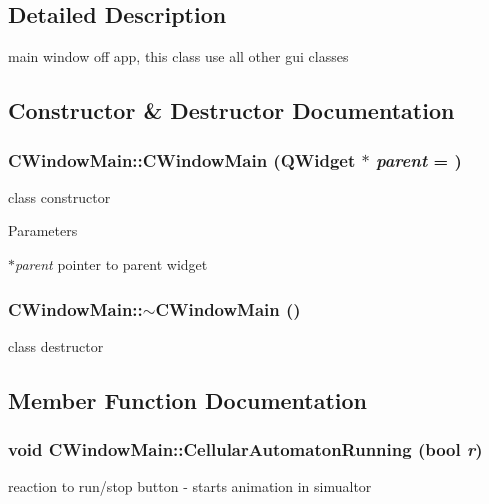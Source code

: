 \subsection{Detailed Description}
main window off app, this class use all other gui classes 

\subsection{Constructor \& Destructor Documentation}
\hypertarget{classCWindowMain_ab2ee214f54da9d9e3493e32c17dceb3b}{
\subsubsection[{CWindowMain}]{\setlength{\rightskip}{0pt plus 5cm}CWindowMain::CWindowMain (QWidget $\ast$ {\em parent} = {})}}
\label{classCWindowMain_ab2ee214f54da9d9e3493e32c17dceb3b}
class constructor


\begin{DoxyParams}{Parameters}
\item[{\em $\ast$parent}]pointer to parent widget \end{DoxyParams}
\hypertarget{classCWindowMain_ae916ee64d7cf20837fa6cf92a94084bb}{
\subsubsection[{$\sim$CWindowMain}]{\setlength{\rightskip}{0pt plus 5cm}CWindowMain::$\sim$CWindowMain ()}}
\label{classCWindowMain_ae916ee64d7cf20837fa6cf92a94084bb}
class destructor 

\subsection{Member Function Documentation}
\hypertarget{classCWindowMain_aba0d4bd86968982f3d61d5fbaeb946e5}{
\subsubsection[{CellularAutomatonRunning}]{\setlength{\rightskip}{0pt plus 5cm}void CWindowMain::CellularAutomatonRunning (bool {\em r})}}
\label{classCWindowMain_aba0d4bd86968982f3d61d5fbaeb946e5}
reaction to run/stop button -\/ starts animation in simualtor


